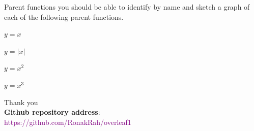 \documentclass{beamer}
\begin{document}
\begin{frame}{Parent functions} \vspace{4pt}
you should be able to identify by name and sketch a graph of each of the following parent functions.
    \begin{enumerate}
    \begin{multicols}{3}
        
   
        \item $y=x$
         \item $y=|x|$
          \item $y=x^2$
           \item $y=x^3$
                  
                   \end{multicols}
    \end{enumerate}
\end{frame}

\begin{frame}[standout]
    \flushleft
\begin{center} Thank you \\
\textbf{Github repository address}:\\
\textcolor{purple} {https://github.com/RonakRah/overleaf1}
\end{center}
\end{frame}
\end{document}
